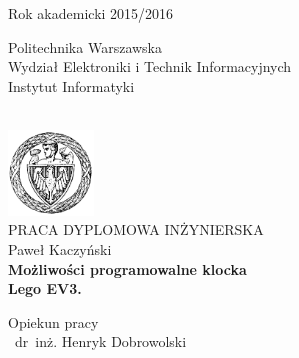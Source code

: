 \begin{titlepage}
    \begin{center}

        \begin{flushright}
            \begin{minipage}{0.35\textwidth}
                Rok akademicki 2015/2016
            \end{minipage}
        \end{flushright}

        \begin{flushleft}
            \begin{minipage}{0.57\textwidth}
                \begin{center}
                    \small
                    Politechnika Warszawska \\
                    Wydział Elektroniki i Technik Informacyjnych \\
                    Instytut Informatyki
                \end{center}
            \end{minipage}
        \end{flushleft}

        ~\\[2.0cm]

        \includegraphics[width=0.17\textwidth]{tytulowa_res/logo_pw.png}~\\[0.3cm]

        \Large PRACA DYPLOMOWA INŻYNIERSKA\\[0.5cm]

        \large Paweł Kaczyński \\[0.5cm]

        \LARGE \textbf{Możliwości programowalne klocka\\Lego EV3.}

        \vfill

        \begin{flushright}
            \begin{minipage}{0.5\textwidth}
                \begin{center} \normalsize
                    Opiekun pracy\\
                    ~dr~inż. Henryk Dobrowolski
                \end{center}
            \end{minipage}
        \end{flushright}


\end{center}
\end{titlepage}
